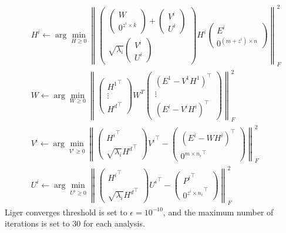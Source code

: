 \begin{equation}
	\begin{aligned}
	&H^i \leftarrow \arg\min_{H\geq 0} \left\| \begin{pmatrix} \begin{pmatrix} W \\ 0^{z^i \times k}\end{pmatrix} +  \begin{pmatrix} V^i \\ U^i\end{pmatrix}  \\ \sqrt{\lambda_i}\begin{pmatrix} V^i \\ U^i\end{pmatrix}\end{pmatrix} H^i \begin{pmatrix}E^i \\ 0^{(m+z^i)\times n}\end{pmatrix} \right\|_{F}^2  \\
	&W \leftarrow \arg \min_{W\geq 0} \left\| \begin{pmatrix} {H^1}^\top \\ \vdots \\ {H^d}^\top \end{pmatrix} W^T  \begin{pmatrix} {(E^1 - V^1 H^1)}^\top \\ \vdots \\{(E^i - V^i H^i)}^\top  \end{pmatrix} \right\|_{F}^2 \\
	&V^i \leftarrow \arg \min_{V^i\geq 0} \left\| \begin{pmatrix} {H^i}^\top \\ \sqrt{\lambda_i}{H^d}^\top \end{pmatrix} {V^i}^\top - \begin{pmatrix} {(E^i - W H^i)}^\top \\ {0^{m\times n_i}}^\top  \end{pmatrix} \right\|_{F}^2 \\
	&U^i \leftarrow \arg \min_{U^i\geq 0} \left\| \begin{pmatrix} {H^i}^\top \\  \\ \sqrt{\lambda_i}{H^d}^\top \end{pmatrix} {U^i}^\top - \begin{pmatrix} {P^i}^\top \\ {0^{z^i\times n_i}}^\top  \end{pmatrix} \right\|_{F}^2
	\end{aligned}
\end{equation}
Liger converges threshold is set to $\epsilon = 10^{-10}$, and the maximum number of iterations is set to 30 for each analysis.

